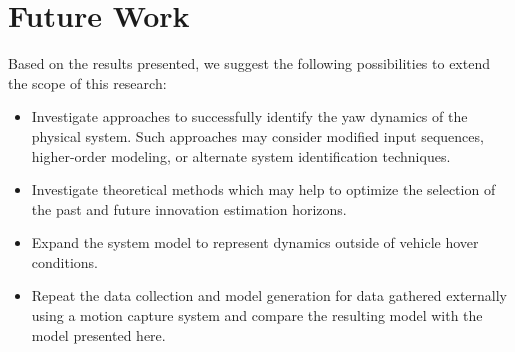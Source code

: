 \section{Future Work}
Based on the results presented, we suggest the following possibilities to extend the scope of this research:
\begin{itemize}
\item Investigate approaches to successfully identify the yaw dynamics of the physical system. Such approaches may consider modified input sequences, higher-order modeling, or alternate system identification techniques. 
\item Investigate theoretical methods which may help to optimize the selection of the past and future innovation estimation horizons.
\item Expand the system model to represent dynamics outside of vehicle hover conditions.
\item Repeat the data collection and model generation for data gathered externally using a motion capture system and compare the resulting model with the model presented here.
\end{itemize}


